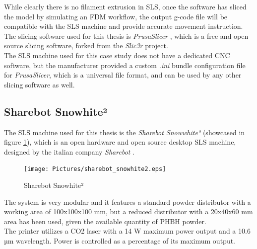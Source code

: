 \documentclass{article}
\begin{document}
          While clearly there is no filament extrusion in SLS, once the software has sliced the model by simulating 
          an FDM workflow, the output g-code file will be compatible with the SLS machine and provide 
          accurate movement instruction. \\
  
          The slicing software used for this thesis is \textit{PrusaSlicer} \autocites{PrusaSlicer}, 
          which is a free and open source slicing software, forked from the \textit{Slic3r} project. \\
  
          The SLS machine used for this case study does not have a dedicated CNC software, but the 
          manufacturer provided a custom \textit{.ini} bundle configuration file for \textit{PrusaSlicer}, which is
          a universal file format, and can be used by any other slicing software as well. \\
          
          
          \clearpage
  
          \subsection{Sharebot Snowhite²\label{Sharebot_Snowhite²}}
  
          The SLS machine used for this thesis is the \textit{Sharebot Snowwhite²} (showcased in figure \ref{fig:Sharebot_Snowhite2}), which is an open hardware and 
          open source desktop SLS machine, designed by the italian company \textit{Sharebot} \autocites{Sharebot}. \\ 
  
          \begin{figure}[h!]
              \centering
              \texttt{[image: Pictures/sharebot\_snowhite2.eps]}
              \caption{Sharebot Snowhite²}
              \label{fig:Sharebot_Snowhite2}
          \end{figure}
  
          The system is very modular and it features a standard powder distributor with a working area of 
          100x100x100 mm, but a reduced distributor with a 20x40x60 mm area has been used, given the available 
          quantity of PHBH powder.  \\ 
  
          The printer utilizes a CO2 laser with a 14 W maximum power output and a 10.6 µm wavelength. Power is controlled as 
          a percentage of its maximum output.  
  
\end{document}
